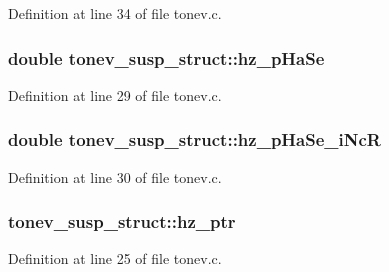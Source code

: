 Definition at line 34 of file tonev.\+c.

\subsubsection[{\texorpdfstring{hz\+\_\+p\+Ha\+Se}{hz_pHaSe}}]{\setlength{\rightskip}{0pt plus 5cm}double tonev\+\_\+susp\+\_\+struct\+::hz\+\_\+p\+Ha\+Se}\hypertarget{structtonev__susp__struct_a7ab11a4eab590104115a1976cb86127e}{}\label{structtonev__susp__struct_a7ab11a4eab590104115a1976cb86127e}


Definition at line 29 of file tonev.\+c.

\subsubsection[{\texorpdfstring{hz\+\_\+p\+Ha\+Se\+\_\+i\+NcR}{hz_pHaSe_iNcR}}]{\setlength{\rightskip}{0pt plus 5cm}double tonev\+\_\+susp\+\_\+struct\+::hz\+\_\+p\+Ha\+Se\+\_\+i\+NcR}\hypertarget{structtonev__susp__struct_a79eb47f7fe42cd41b77f2330cbc0403a}{}\label{structtonev__susp__struct_a79eb47f7fe42cd41b77f2330cbc0403a}


Definition at line 30 of file tonev.\+c.

\subsubsection[{\texorpdfstring{hz\+\_\+ptr}{hz_ptr}}]{ tonev\+\_\+susp\+\_\+struct\+::hz\+\_\+ptr}\hypertarget{structtonev__susp__struct_a8346a0c6b3b0ea8afd1d1254ce74d775}{}\label{structtonev__susp__struct_a8346a0c6b3b0ea8afd1d1254ce74d775}


Definition at line 25 of file tonev.\+c.


